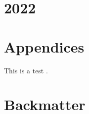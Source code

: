 %

\tableofcontents
\listoffigures
\listoftables
\renewcommand\listoflistingscaption{List of source codes}
\listoflistings
\mainmatter%

\part{2022}
\setcounter{chapter}{0}













\part{Appendices}
This is a test \cite{Mooers2016DirectMethodsStructureDeterminationOfATrypanosomeRNAEditingSubstrateFragmentWithTranslationalPseudosymmetry}.
\appendix
%
%
% 
% 
%
% 
% 
% 
% 
% 
% 
% 
% 
%  
% 
% 
% 
% 
% 
% 
\part{Backmatter}
\backmatter %

\printindex

